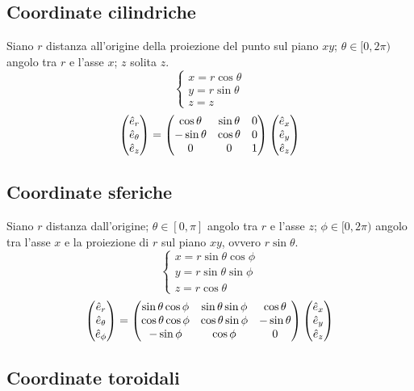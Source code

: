 \documentclass[11pt,landscape]{article}
\begin{document}
\begin{multicols}{3}
    \subsection{Coordinate cilindriche}
        Siano $r$ distanza all'origine della proiezione del punto sul piano $xy$; $\theta \in [0, 2\pi)$ angolo tra $r$ e l'asse $x$; $z$ solita $z$.
        $$ \begin{cases}
            x = r \cos \theta \\
            y = r \sin \theta \\
            z = z
        \end{cases}$$
        $$\begin{pmatrix} \hat{e}_r \\ \hat{e}_\theta \\ \hat{e}_z \end{pmatrix} = 
            \begin{pmatrix}
                \cos \theta & \sin \theta & 0 \\
                -\sin \theta & \cos \theta & 0 \\
                0 & 0 & 1
            \end{pmatrix}
        \begin{pmatrix} \hat{e}_x \\\hat{e}_y \\\hat{e}_z \end{pmatrix}$$
    \subsection{Coordinate sferiche}
        Siano $r$ distanza dall'origine; $\theta \in [0,\pi]$ angolo tra $r$ e l'asse $z$; $\phi \in [0, 2\pi)$ angolo tra l'asse $x$ e la proiezione di $r$ sul piano $xy$, ovvero $r \sin \theta$.
        $$\begin{cases}
            x = r \sin \theta \cos \phi \\
            y = r \sin \theta \sin \phi \\
            z = r \cos \theta
        \end{cases}$$
        $$\begin{pmatrix} \hat{e}_r \\ \hat{e}_\theta \\ \hat{e}_\phi \end{pmatrix} = 
        \begin{pmatrix}
            \sin \theta \cos \phi & \sin \theta \sin \phi & \cos \theta \\
            \cos \theta \cos \phi & \cos \theta \sin \phi & -\sin \theta \\
            - \sin \phi & \cos \phi & 0
        \end{pmatrix}
        \begin{pmatrix} \hat{e}_x \\\hat{e}_y \\\hat{e}_z \end{pmatrix}$$
    \subsection{Coordinate toroidali}

    


\end{multicols}
\end{document}
